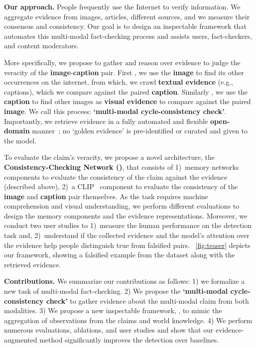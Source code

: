 \textbf{Our approach.} People frequently use the Internet to verify information. We aggregate evidence from images, articles, different sources, and we measure their consensus and consistency. Our goal is to design an inspectable framework that automates this multi-modal fact-checking process and assists users, fact-checkers, and content moderators. 

More specifically, we propose to gather and reason over evidence to judge the veracity of the \textbf{\textcolor{myOrange}{image}}-\textbf{\textcolor{myblue}{caption}} pair. First , we use the \textbf{\textcolor{myOrange}{image}} to find its other occurrences on the internet, from which, we crawl \textbf{\textcolor{myblue}{textual evidence}} (e.g., captions), which we compare against the paired \textbf{\textcolor{myblue}{caption}}. Similarly , we use the \textbf{\textcolor{myblue}{caption}} to find other images as \textbf{\textcolor{myOrange}{visual evidence}} to compare against the paired \textbf{\textcolor{myOrange}{image}}. We call this process: \textbf{`multi-modal cycle-consistency check'}. Importantly, we retrieve evidence in a fully automated and flexible \textbf{open-domain} manner~\cite{chen2017reading}; no `golden evidence' is pre-identified or curated 
and given to the model. 

To evaluate the claim's veracity, we propose a novel architecture, the \textbf{Consistency-Checking Network (\model{})}, that consists of 1)~memory networks components to evaluate the consistency of the claim against the evidence (described above), 2)~a CLIP~\cite{radford2021learning} component to evaluate the consistency of the \textbf{\textcolor{myOrange}{image}} and \textbf{\textcolor{myblue}{caption}} pair themselves. As the task requires machine comprehension and visual understanding, we perform different evaluations to design the memory components and the evidence representations. Moreover, we conduct two user studies to 1)~measure the human performance on the detection task and, 2)~understand if the collected evidence and the model's attention over the evidence help people distinguish true from falsified pairs.
~\autoref{fig:teaser} depicts our framework, showing a falsified example from the dataset along with the retrieved evidence.


\textbf{Contributions.} We summarize our contributions as follows: 1) we formalize a new task of multi-modal fact-checking. 2) We propose the \textbf{`multi-modal cycle-consistency check'} to gather evidence about the multi-modal claim from both modalities. 3) We propose a new inspectable framework, \textbf{\model{}}, to mimic the aggregation of observations from the claims and world knowledge. 4) We perform numerous evaluations, ablations, and user studies and show that our evidence-augmented method significantly improves the detection over baselines. 
